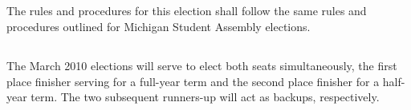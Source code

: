 \subsection{}
The rules and procedures for this election shall follow the same rules and procedures outlined for Michigan Student Assembly elections.

\subsection{}
The March 2010 elections will serve to elect both seats simultaneously, the first place finisher serving for a full-year term and the second place finisher for a half-year term. The two subsequent runners-up will act as backups, respectively.
